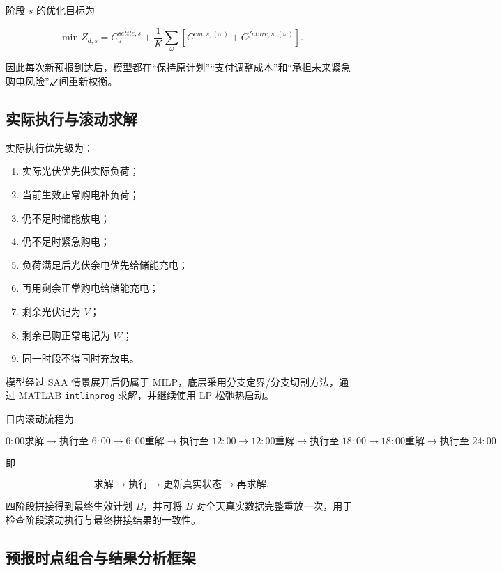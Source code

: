 阶段 \(s\) 的优化目标为

\begin{equation}
\min Z_{d,s}
=
C^{settle,s}_d
+
\frac1K
\sum_{\omega}
\left[
C^{em,s,(\omega)}
+
C^{future,s,(\omega)}
\right].
\end{equation}

因此每次新预报到达后，模型都在“保持原计划”“支付调整成本”和“承担未来紧急购电风险”之间重新权衡。

\subsection{实际执行与滚动求解}

实际执行优先级为：

\begin{enumerate}
\item 实际光伏优先供实际负荷；
\item 当前生效正常购电补负荷；
\item 仍不足时储能放电；
\item 仍不足时紧急购电；
\item 负荷满足后光伏余电优先给储能充电；
\item 再用剩余正常购电给储能充电；
\item 剩余光伏记为 \(V\)；
\item 剩余已购正常电记为 \(W\)；
\item 同一时段不得同时充放电。
\end{enumerate}

模型经过 SAA 情景展开后仍属于 MILP，底层采用分支定界/分支切割方法，通过 MATLAB \texttt{intlinprog} 求解，并继续使用 LP 松弛热启动。

日内滚动流程为

\[
\boxed{
0{:}00\text{求解}
\rightarrow
\text{执行至 }6{:}00
\rightarrow
6{:}00\text{重解}
\rightarrow
\text{执行至 }12{:}00
\rightarrow
12{:}00\text{重解}
\rightarrow
\text{执行至 }18{:}00
\rightarrow
18{:}00\text{重解}
\rightarrow
\text{执行至 }24{:}00
}
\]

即

\[
\boxed{
\text{求解}
\rightarrow
\text{执行}
\rightarrow
\text{更新真实状态}
\rightarrow
\text{再求解}
}.
\]

四阶段拼接得到最终生效计划 \(B\)，并可将 \(B\) 对全天真实数据完整重放一次，用于检查阶段滚动执行与最终拼接结果的一致性。

\subsection{预报时点组合与结果分析框架}

